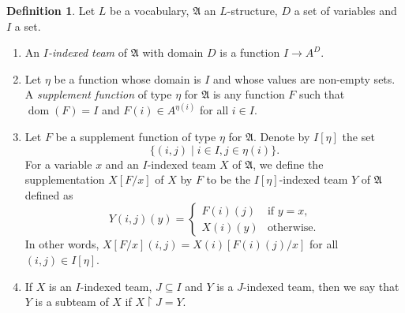 \documentclass[12pt]{article}
\theoremstyle{definition}
\newtheorem{definition}{Definition}[section]
\newcommand{\A}{\mathfrak{A}}
\DeclareMathOperator{\dom}{dom}
\begin{document}
\begin{definition}
    Let $L$ be a vocabulary, $\A$ an $L$-structure, $D$ a set of variables and $I$ a set.
    \begin{enumerate}
        \item An \emph{$I$-indexed team} of $\A$ with domain $D$ is a function $I\to A^D$.
        \item Let $\eta$ be a function whose domain is $I$ and whose values are non-empty sets. A \emph{supplement function} of type $\eta$ for $\A$ is any function $F$ such that $\dom(F) = I$ and $F(i)\in A^{\eta(i)}$ for all $i\in I$.
        \item Let $F$ be a supplement function of type $\eta$ for $\A$. Denote by $I[\eta]$ the set
        \[
            \{ (i,j) \mid i\in I, j\in\eta(i) \}.
        \]
        For a variable $x$ and an $I$-indexed team $X$ of $\A$, we define the supplementation $X[F/x]$ of $X$ by $F$ to be the $I[\eta]$-indexed team $Y$ of $\A$ defined as
        \[
            Y(i,j)(y) =
            \begin{cases}
                F(i)(j) & \text{if $y = x$}, \\
                X(i)(y) & \text{otherwise}.
            \end{cases}
        \]
        In other words, $X[F/x](i,j) = X(i)[F(i)(j)/x]$ for all $(i,j)\in I[\eta]$.
        \item If $X$ is an $I$-indexed team, $J\subseteq I$ and $Y$ is a $J$-indexed team, then we say that $Y$ is a subteam of $X$ if $X\restriction J = Y$.
    \end{enumerate}
\end{definition}
\end{document}
